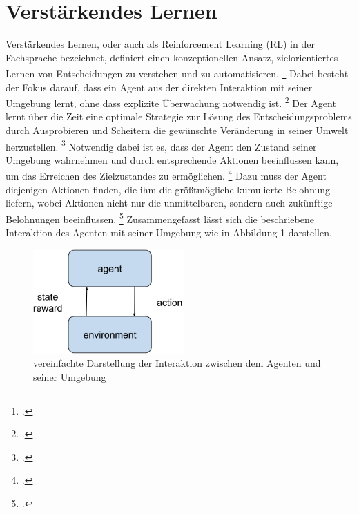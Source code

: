 \section{Verstärkendes Lernen}
Verstärkendes Lernen, oder auch als Reinforcement Learning (RL) in der Fachsprache bezeichnet, definiert einen konzeptionellen Ansatz, zielorientiertes Lernen von Entscheidungen zu verstehen und zu automatisieren. \footcite[Vgl.][S. 13]{Sutton.2018}
Dabei besteht der Fokus darauf, dass ein Agent aus der direkten Interaktion mit seiner Umgebung lernt, ohne dass explizite Überwachung notwendig ist. \footcite[Vgl.][S. 13]{Sutton.2018}
Der Agent lernt über die Zeit eine optimale Strategie zur Lösung des Entscheidungsproblems durch Ausprobieren und Scheitern die gewünschte Veränderung in seiner Umwelt herzustellen. \footcite[Vgl.][S. 4]{Li.2019}
Notwendig dabei ist es, dass der Agent den Zustand seiner Umgebung wahrnehmen und durch entsprechende Aktionen beeinflussen kann, um das Erreichen des Zielzustandes zu ermöglichen. \footcite[Vgl.][S. 2]{Sutton.2018}
Dazu muss der Agent diejenigen Aktionen finden, die ihm die größtmögliche kumulierte Belohnung liefern, wobei Aktionen nicht nur die unmittelbaren, sondern auch zukünftige Belohnungen beeinflussen. \footcite[Vgl.][S. 1]{Sutton.2018}
Zusammengefasst lässt sich die beschriebene Interaktion des Agenten mit seiner Umgebung wie in Abbildung 1 darstellen.
\begin{figure}[htb]
    \centering
    \includegraphics[height=4cm]{lib/graphics/Agent-Environment interaction.png}
    \caption[vereinfachte Darstellung der Interaktion zwischen dem Agenten und seiner Umgebung]{vereinfachte Darstellung der Interaktion zwischen dem Agenten und seiner Umgebung\footnotemark}
    \label{abb:Agent-Environment interaction}
\end{figure}

